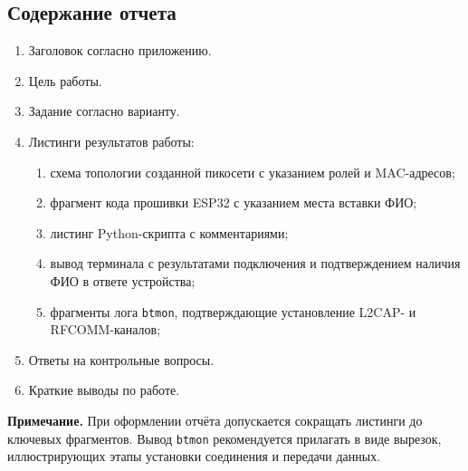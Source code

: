 \subsection{Содержание отчета}
\begin{enumerate}[nosep, leftmargin=*]
    \item Заголовок согласно приложению.
    \item Цель работы.
    \item Задание согласно варианту.
    \item Листинги результатов работы:
    \begin{enumerate}[label=\alph*), nosep]
        \item схема топологии созданной пикосети с указанием ролей и MAC-адресов;
        \item фрагмент кода прошивки ESP32 с указанием места вставки ФИО;
        \item листинг Python-скрипта с комментариями;
        \item вывод терминала с результатами подключения и подтверждением наличия ФИО в ответе устройства;
        \item фрагменты лога \texttt{btmon}, подтверждающие установление L2CAP- и RFCOMM-каналов;
    \end{enumerate}
    \item Ответы на контрольные вопросы.
    \item Краткие выводы по работе.
\end{enumerate}

\textbf{Примечание.} При оформлении отчёта допускается сокращать листинги до ключевых фрагментов. Вывод \texttt{btmon} рекомендуется прилагать в виде вырезок, иллюстрирующих этапы установки соединения и передачи данных.


